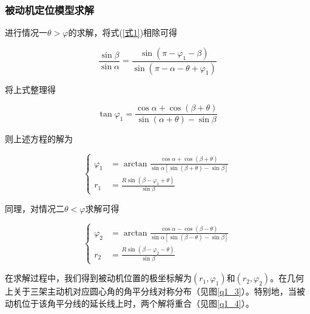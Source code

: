 \documentclass[withoutpreface,bwprint]{cumcmthesis} %
\begin{document}
\subsubsection{被动机定位模型求解}

进行情况一$\theta>\varphi$的求解，将式(\ref{式1})相除可得

\begin{equation}
    \frac{\sin\beta}{\sin\alpha} = \frac{\sin(\pi - \varphi_1 -\beta)}{\sin(\pi - \alpha - \theta + \varphi_1)}
\end{equation}

将上式整理得

\begin{equation}
    \tan\varphi_1= \frac{\cos\alpha + \cos(\beta +\theta)}{\sin(\alpha+\theta)- \sin\beta}
\end{equation}

则上述方程的解为

\begin{equation}
    \left\{
        \begin{aligned}
            \varphi_1 &= \arctan \frac{\cos\alpha+\cos(\beta+\theta)}{\sin\alpha[\sin(\beta+\theta)-\sin\beta]} \\
            r_1 &= \frac{R \sin(\beta-\varphi_1+\theta)}{\sin\beta}
        \end{aligned}
    \right.
    \label{解1}
\end{equation}

同理，对情况二$\theta<\varphi$求解可得

\begin{equation}
    \left\{
        \begin{aligned}
            \varphi_2 &= \arctan \frac{\cos\alpha-\cos(\beta-\theta)}{\sin\alpha[\sin(\beta-\theta)-\sin\beta]} \\
            r_2 &= \frac{R \sin(\beta-\varphi_2-\theta)}{\sin\beta}
        \end{aligned}
    \right.
\end{equation}

在求解过程中，我们得到被动机位置的极坐标解为\((r_1,\varphi_1)\)和\((r_2,\varphi_2)\)。在几何上关于三架主动机对应圆心角的角平分线对称分布（见图\ref{q1_3}）。特别地，当被动机位于该角平分线的延长线上时，两个解将重合（见图\ref{q1_4}）。
\end{document}
